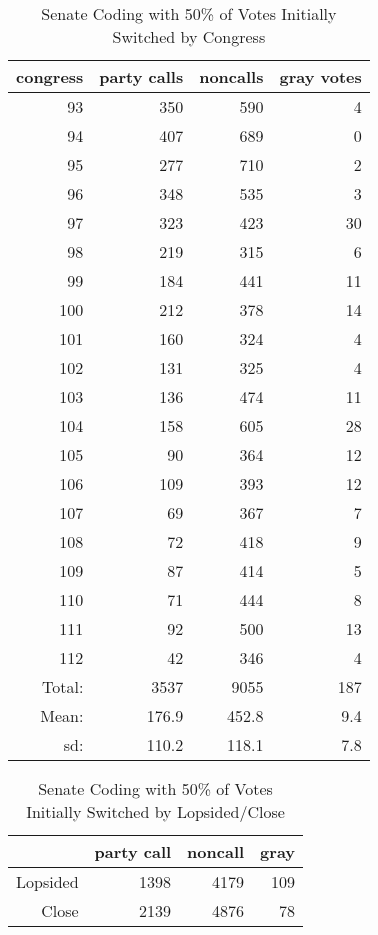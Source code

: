 \documentclass[12pt]{article}
\begin{document}
\begin{table}[ht]
	\centering
	\caption{Senate Coding with 50\% of Votes Initially Switched by Congress}
	\begin{tabular}{rrrr}
		\hline
		congress & party calls & noncalls & gray votes \\
		\hline
		93 & 350 & 590 &   4 \\
		94 & 407 & 689 &   0 \\
		95 & 277 & 710 &   2 \\
		96 & 348 & 535 &   3 \\
		97 & 323 & 423 &  30 \\
		98 & 219 & 315 &   6 \\
		99 & 184 & 441 &  11 \\
		100 & 212 & 378 &  14 \\
		101 & 160 & 324 &   4 \\
		102 & 131 & 325 &   4 \\
		103 & 136 & 474 &  11 \\
		104 & 158 & 605 &  28 \\
		105 &  90 & 364 &  12 \\
		106 & 109 & 393 &  12 \\
		107 &  69 & 367 &   7 \\
		108 &  72 & 418 &   9 \\
		109 &  87 & 414 &   5 \\
		110 &  71 & 444 &   8 \\
		111 &  92 & 500 &  13 \\
		112 &  42 & 346 &   4 \\
		\hline
		Total: & 3537 & 9055 & 187 \\
		Mean: & 176.9 & 452.8 & 9.4 \\
		sd: & 110.2 & 118.1 & 7.8 \\
		\hline
	\end{tabular}
\end{table}

\begin{table}[ht]
	\centering
	\caption{Senate Coding with 50\% of Votes Initially Switched by Lopsided/Close}
	\begin{tabular}{rrrr}
		\hline
		& party call  & noncall & gray \\
		\hline
		Lopsided & 1398 & 4179 & 109 \\
		Close & 2139 & 4876 & 78 \\
		\hline
	\end{tabular}
\end{table}
\end{document}
